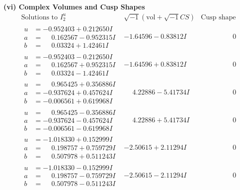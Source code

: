 \documentclass[1p]{elsarticle_modified}
\theoremstyle{definition}
\newcommand{\I}{\sqrt{-1}}
\begin{document}
\newpage\flushleft \textbf{(vi) Complex Volumes and Cusp Shapes}
$$\begin{array}{c|c|c}  
\text{Solutions to }I^u_{2}& \I (\text{vol} + \sqrt{-1}CS) & \text{Cusp shape}\\
 \hline 
\begin{aligned}
u &= -0.952403 + 0.212650 I \\
a &= \phantom{-}0.162567 - 0.952315 I \\
b &= \phantom{-}0.03324 + 1.42461 I\end{aligned}
 & -1.64596 - 0.83812 I & \phantom{-0.000000 } 0 \\ \hline\begin{aligned}
u &= -0.952403 - 0.212650 I \\
a &= \phantom{-}0.162567 + 0.952315 I \\
b &= \phantom{-}0.03324 - 1.42461 I\end{aligned}
 & -1.64596 + 0.83812 I & \phantom{-0.000000 } 0 \\ \hline\begin{aligned}
u &= \phantom{-}0.965425 + 0.356886 I \\
a &= -0.937624 + 0.457624 I \\
b &= -0.006561 + 0.619968 I\end{aligned}
 & \phantom{-}4.22886 - 5.41734 I & \phantom{-0.000000 } 0 \\ \hline\begin{aligned}
u &= \phantom{-}0.965425 - 0.356886 I \\
a &= -0.937624 - 0.457624 I \\
b &= -0.006561 - 0.619968 I\end{aligned}
 & \phantom{-}4.22886 + 5.41734 I & \phantom{-0.000000 } 0 \\ \hline\begin{aligned}
u &= -1.018330 + 0.152999 I \\
a &= \phantom{-}0.198757 + 0.759729 I \\
b &= \phantom{-}0.507978 + 0.511243 I\end{aligned}
 & -2.50615 + 2.11294 I & \phantom{-0.000000 } 0 \\ \hline\begin{aligned}
u &= -1.018330 - 0.152999 I \\
a &= \phantom{-}0.198757 - 0.759729 I \\
b &= \phantom{-}0.507978 - 0.511243 I\end{aligned}
 & -2.50615 - 2.11294 I & \phantom{-0.000000 } 0 \\ \hline\begin{aligned}

\end{aligned}
\end{array}$$
\end{document}

